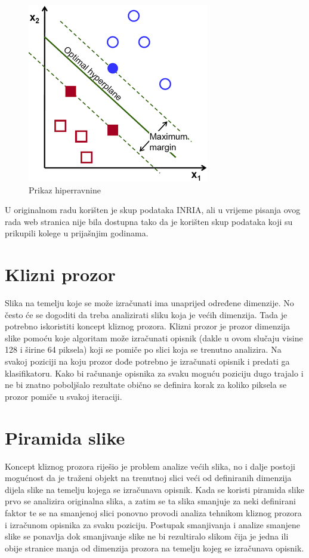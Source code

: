 \documentclass[times, utf8, zavrsni]{fer}
\begin{document}
\begin{figure}[htb]
	\centering
	\includegraphics[width=0.5\linewidth]{figures/optimal-hyperplane.png}
	\caption{Prikaz hiperravnine\protect\footnotemark}
	\label{fig:hyperplane}
\end{figure}


U originalnom radu \cite{dalal2005histograms} korišten je skup podataka INRIA\protect\footnotemark, ali u vrijeme pisanja ovog rada web stranica nije bila dostupna tako da je korišten skup podataka koji su prikupili kolege u prijašnjim godinama.


\section{Klizni prozor}
Slika na temelju koje se može izračunati ima unaprijed određene dimenzije. No često će se dogoditi da treba analizirati sliku koja je većih dimenzija. Tada je potrebno iskoristiti koncept kliznog prozora. Klizni prozor je prozor dimenzija slike pomoću koje algoritam može izračunati opisnik (dakle u ovom slučaju visine 128 i širine 64 piksela) koji se pomiče po slici koja se trenutno analizira. Na svakoj poziciji na koju prozor dođe potrebno je izračunati opisnik i predati ga klasifikatoru. Kako bi računanje opisnika za svaku moguću poziciju dugo trajalo i ne bi znatno poboljšalo rezultate obično se definira korak za koliko piksela se prozor pomiče u svakoj iteraciji.

\section{Piramida slike}
Koncept kliznog prozora riješio je problem analize većih slika, no i dalje postoji mogućnost da je traženi objekt na trenutnoj slici veći od definiranih dimenzija dijela slike na temelju kojega se izračunava opisnik. Kada se koristi piramida slike prvo se analizira originalna slika, a zatim se ta slika smanjuje za neki definirani faktor te se na smanjenoj slici ponovno provodi analiza tehnikom kliznog prozora i izračunom opisnika za svaku poziciju. Postupak smanjivanja i analize smanjene slike se ponavlja dok smanjivanje slike ne bi rezultiralo slikom čija je jedna ili obije stranice manja od dimenzija prozora na temelju kojeg se izračunava opisnik.
\end{document}
